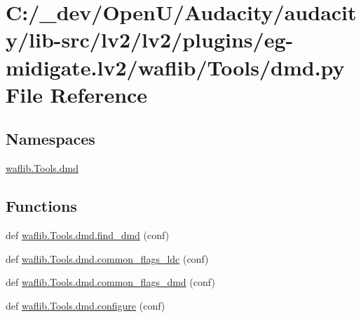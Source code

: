 \hypertarget{lv2_2plugins_2eg-midigate_8lv2_2waflib_2_tools_2dmd_8py}{}\section{C\+:/\+\_\+dev/\+Open\+U/\+Audacity/audacity/lib-\/src/lv2/lv2/plugins/eg-\/midigate.lv2/waflib/\+Tools/dmd.py File Reference}
\label{lv2_2plugins_2eg-midigate_8lv2_2waflib_2_tools_2dmd_8py}
\subsection*{Namespaces}
\begin{DoxyCompactItemize}
\item 
 \hyperlink{namespacewaflib_1_1_tools_1_1dmd}{waflib.\+Tools.\+dmd}
\end{DoxyCompactItemize}
\subsection*{Functions}
\begin{DoxyCompactItemize}
\item 
def \hyperlink{namespacewaflib_1_1_tools_1_1dmd_a4325581bb5714f5478adf1c1c00ca3cd}{waflib.\+Tools.\+dmd.\+find\+\_\+dmd} (conf)
\item 
def \hyperlink{namespacewaflib_1_1_tools_1_1dmd_a491ac92b35c587c124f8738a31c30cd9}{waflib.\+Tools.\+dmd.\+common\+\_\+flags\+\_\+ldc} (conf)
\item 
def \hyperlink{namespacewaflib_1_1_tools_1_1dmd_a418d35f6869615d32f9b91891f3d1d7c}{waflib.\+Tools.\+dmd.\+common\+\_\+flags\+\_\+dmd} (conf)
\item 
def \hyperlink{namespacewaflib_1_1_tools_1_1dmd_a9ba96fbd5fe75ddd056e372285afa6e9}{waflib.\+Tools.\+dmd.\+configure} (conf)
\end{DoxyCompactItemize}
